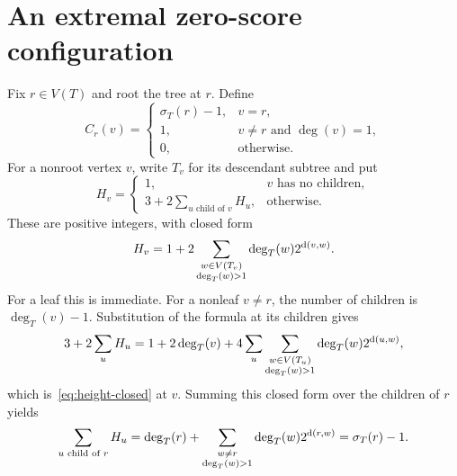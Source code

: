 \section{An extremal zero-score configuration}\label{sec:obstruction}
Fix $r\in V(T)$ and root the tree at $r$. Define
\begin{equation}\label{eq:obstruction}
 C_r(v)=\begin{cases}
 \sigma_T(r)-1,&v=r,\\
 1,&v\ne r\text{ and }\deg(v)=1,\\
 0,&\text{otherwise}.
 \end{cases}
\end{equation}
For a nonroot vertex $v$, write $T_v$ for its descendant subtree and put
\begin{equation}\label{eq:obstruction-height}
 H_v=\begin{cases}
 1,&v\text{ has no children},\\
 3+2\sum_{u\text{ child of }v}H_u,&\text{otherwise}.
 \end{cases}
\end{equation}
These are positive integers, with closed form
\begin{equation}\label{eq:height-closed}
 H_v=1+2\sum_{\substack{w\in V(T_v)\\\deg_T(w)>1}}
                      \deg_T(w)2^{\operatorname{d}(v,w)}.
\end{equation}
For a leaf this is immediate. For a nonleaf $v\ne r$, the number of
children is $\deg_T(v)-1$. Substitution of the formula at its children
gives
\[
 3+2\sum_uH_u
 =1+2\deg_T(v)+4\sum_u\sum_{\substack{w\in V(T_u)\\\deg_T(w)>1}}
                        \deg_T(w)2^{\operatorname{d}(u,w)},
\]
which is~\eqref{eq:height-closed} at $v$.
Summing this closed form over the children of $r$ yields
\begin{equation}\label{eq:height-root}
 \sum_{u\text{ child of }r}H_u
 =\deg_T(r)+\sum_{\substack{w\ne r\\\deg_T(w)>1}}
                         \deg_T(w)2^{\operatorname{d}(r,w)}
 =\sigma_T(r)-1.
\end{equation}

